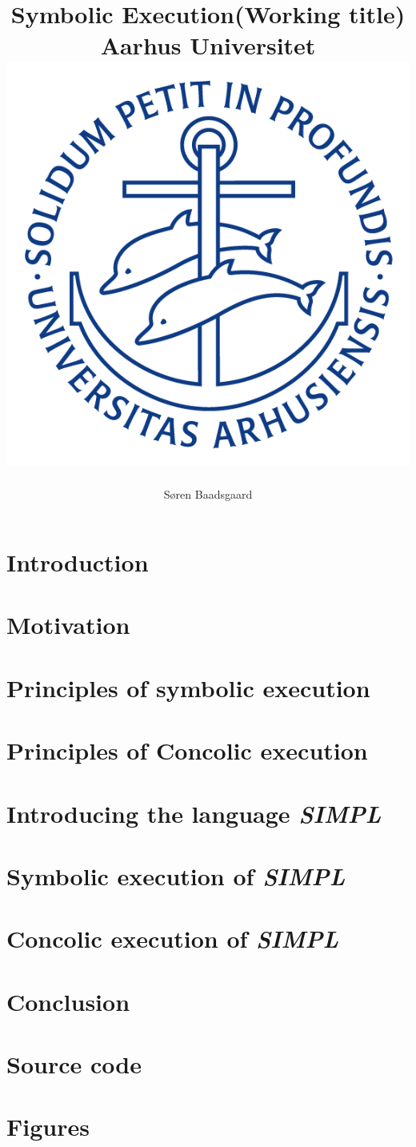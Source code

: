 \documentclass[]{report}
\title{
	\textbf{Symbolic Execution(Working title)}\\
	{\large Aarhus Universitet}\\
	{\includegraphics[scale=0.5]{ausegl_blaa.png}}	
	}
\author{Søren Baadsgaard}
\newcommand{\explanguage}{\textsl{SIMPL }}
\begin{document}
\maketitle

\begin{abstract}
\end{abstract}

\tableofcontents

\chapter{Introduction}
	
	
\chapter{Motivation}
	
\chapter{Principles of symbolic execution}
	

\chapter{Principles of Concolic execution}
	
\chapter{Introducing the language \explanguage}
	
\chapter{Symbolic execution of \explanguage}
	
\chapter{Concolic execution of \explanguage}

\chapter{Conclusion}
	

\appendix

\chapter{Source code}
%
\chapter{Figures}



\end{document}
